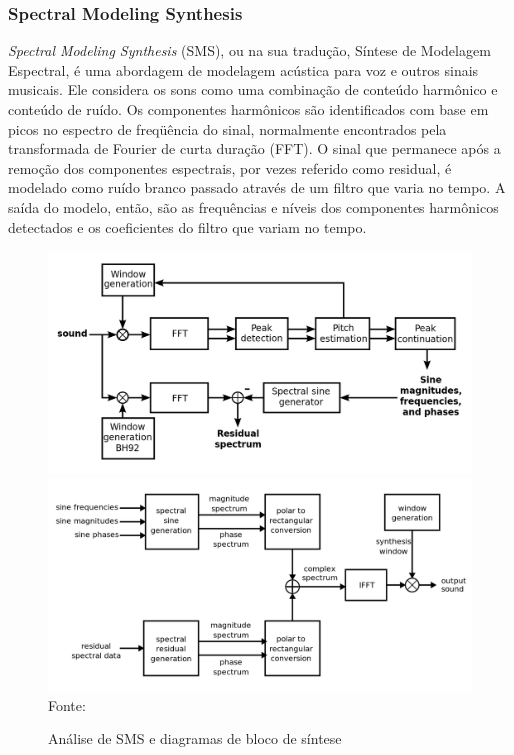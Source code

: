 \subsubsection{Spectral Modeling Synthesis} \label{subsubsec:sms}
\textit{Spectral Modeling Synthesis} (SMS), ou na sua tradução, Síntese de Modelagem Espectral, é uma abordagem de modelagem acústica para voz e outros sinais musicais. Ele considera os sons como uma combinação de conteúdo harmônico e conteúdo de ruído. Os componentes harmônicos são identificados com base em picos no espectro de freqüência do sinal, normalmente encontrados pela transformada de Fourier de curta duração (FFT). O sinal que permanece após a remoção dos componentes espectrais, por vezes referido como residual, é modelado como ruído branco passado através de um filtro que varia no tempo. A saída do modelo, então, são as frequências e níveis dos componentes harmônicos detectados e os coeficientes do filtro que variam no tempo.

\begin{figure}[!htb]
   \centering
   \caption{Análise de SMS e diagramas de bloco de síntese}\label{fig:smsProcesso} 
   \includegraphics[scale=0.18]{figuras/sms.png}
   \includegraphics[scale=0.18]{figuras/sms2.png}
   \\Fonte: \cite{bonada2001}
\end{figure}


